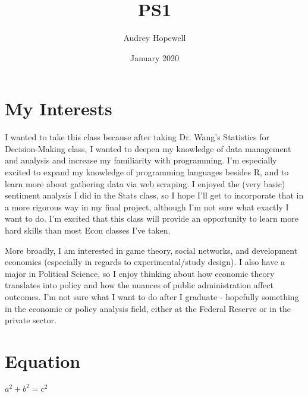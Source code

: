 \documentclass{article}
\title{PS1}
\author{Audrey Hopewell}
\date{January 2020}
\begin{document}
\maketitle

\section{My Interests}
I wanted to take this class because after taking Dr. Wang's Statistics for Decision-Making class, I wanted to deepen my knowledge of data management and analysis and increase my familiarity with programming. I'm especially excited to expand my knowledge of programming languages besides R, and to learn more about gathering data via web scraping. I enjoyed the (very basic) sentiment analysis I did in the Stats class, so I hope I'll get to incorporate that in a more rigorous way in my final project, although I'm not sure what exactly I want to do. I'm excited that this class will provide an opportunity to learn more hard skills than most Econ classes I've taken.

More broadly, I am interested in game theory, social networks, and development economics (especially in regards to experimental/study design). I also have a major in Political Science, so I enjoy thinking about how economic theory translates into policy and how the nuances of public administration affect outcomes. I'm not sure what I want to do after I graduate - hopefully something in the economic or policy analysis field, either at the Federal Reserve or in the private sector.


\section{Equation}
$ a^2 + b^2 = c^2 $
\end{document}
